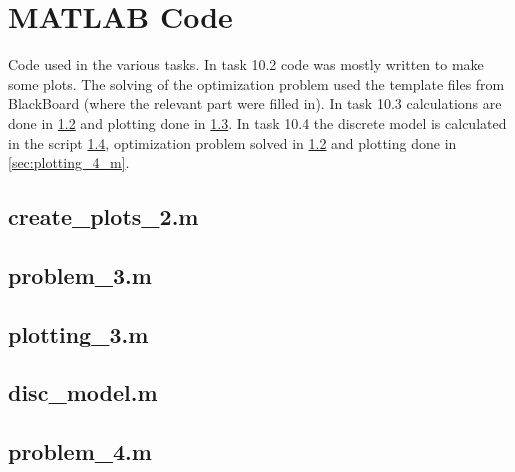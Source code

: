 \appendix

\section{MATLAB Code}\label{sec:matlab}
Code used in the various tasks. In task 10.2 code was mostly written to make some plots. The solving of the optimization problem used the template files from BlackBoard (where the relevant part were filled in). In task 10.3 calculations are done in \cref{sec:problem_3_m} and plotting done in \cref{sec:plotting_3_m}. In task 10.4 the discrete model is calculated in the script \cref{sec:disc_model_m}, optimization problem solved in \cref{sec:problem_3_m} and plotting done in \cref{sec:plotting_4_m}.

\vspace{1cm}

\subsection{create\_plots\_2.m}\label{sec:create_plots_2_m}


\vspace{1cm}

\subsection{problem\_3.m}\label{sec:problem_3_m}


\vspace{1cm}

\subsection{plotting\_3.m}\label{sec:plotting_3_m}


\vspace{1cm}

\subsection{disc\_model.m}\label{sec:disc_model_m}


\vspace{1cm}

\subsection{problem\_4.m}\label{sec:problem_4_m}


